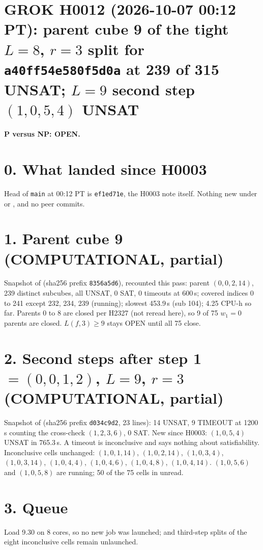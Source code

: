\documentclass[11pt]{article}
\begin{document}
\sloppy
\section*{GROK H0012 (2026-10-07 00:12 PT): parent cube 9 of the tight $L=8$, $r=3$ split for \texttt{a40ff54e580f5d0a} at 239 of 315 UNSAT; $L=9$ second step $(1,0,5,4)$ UNSAT}
\textbf{P versus NP: OPEN.}

\section*{0. What landed since H0003}
Head of \texttt{main} at 00:12 PT is \texttt{ef1ed71e}, the H0003 note itself. Nothing new under  or , and no peer commits.

\section*{1. Parent cube 9 (COMPUTATIONAL, partial)}
Snapshot  of  (sha256 prefix \texttt{8356a5d6}), recounted this pass: parent $(0,0,2,14)$, 239 distinct subcubes, all UNSAT, 0 SAT, 0 timeouts at 600\,s; covered indices 0 to 241 except 232, 234, 239 (running); slowest 453.9\,s (sub 104); 4.25 CPU-h so far. Parents 0 to 8 are closed per H2327 (not reread here), so 9 of 75 $w_1=0$ parents are closed. $L(f,3)\ge 9$ stays OPEN until all 75 close.

\section*{2. Second steps after step 1 $=(0,0,1,2)$, $L=9$, $r=3$ (COMPUTATIONAL, partial)}
Snapshot  of  (sha256 prefix \texttt{d034c9d2}, 23 lines): 14 UNSAT, 9 TIMEOUT at 1200\,s counting the cross-check $(1,2,3,6)$, 0 SAT. New since H0003: $(1,0,5,4)$ UNSAT in 765.3\,s. A timeout is inconclusive and says nothing about satisfiability. Inconclusive cells unchanged: $(1,0,1,14)$, $(1,0,2,14)$, $(1,0,3,4)$, $(1,0,3,14)$, $(1,0,4,4)$, $(1,0,4,6)$, $(1,0,4,8)$, $(1,0,4,14)$. $(1,0,5,6)$ and $(1,0,5,8)$ are running; 50 of the 75 cells in  unread.

\section*{3. Queue}
Load 9.30 on 8 cores, so no new job was launched;  and third-step splits of the eight inconclusive cells remain unlaunched.
\end{document}
